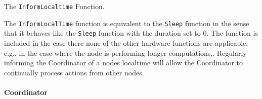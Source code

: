 \begin{algorithm}[ht]
    \DontPrintSemicolon
    
    
    \caption{The \texttt{InformLocaltime} Function.}
    \label{algo:hwfuncsupdatelocaltime}
\end{algorithm}

The \texttt{InformLocalTime} function is equivalent to the \texttt{Sleep} function in the sense that it behaves like the \texttt{Sleep} function with the duration set to 0. The function is included in the case there none of the other hardware functions are applicable, e.g., in the case where the node is performing longer computations,. Regularly informing the Coordinator of a nodes localtime will allow the Coordinator to continually process actions from other nodes.

\clearpage

\paragraph{Coordinator} \ 


